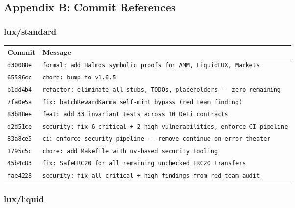 \documentclass[
]{article}
\newcounter{none} %
\begin{document}
\subsection{Appendix B: Commit
References}\label{appendix-b-commit-references}

\subsubsection{lux/standard}\label{luxstandard}

{\def\LTcaptype{none} %
\begin{longtable}[]{@{}ll@{}}
\toprule\noalign{}
Commit & Message \\
\midrule\noalign{}
\endhead
\bottomrule\noalign{}
\endlastfoot
\texttt{d30088e} &
\texttt{formal:\ add\ Halmos\ symbolic\ proofs\ for\ AMM,\ LiquidLUX,\ Markets} \\
\texttt{65586cc} & \texttt{chore:\ bump\ to\ v1.6.5} \\
\texttt{b1dd4b4} &
\texttt{refactor:\ eliminate\ all\ stubs,\ TODOs,\ placeholders\ -\/-\ zero\ remaining} \\
\texttt{7fa0e5a} &
\texttt{fix:\ batchRewardKarma\ self-mint\ bypass\ (red\ team\ finding)} \\
\texttt{83b88ee} &
\texttt{feat:\ add\ 33\ invariant\ tests\ across\ 10\ DeFi\ contracts} \\
\texttt{d2d51ce} &
\texttt{security:\ fix\ 6\ critical\ +\ 2\ high\ vulnerabilities,\ enforce\ CI\ pipeline} \\
\texttt{83a8ce5} &
\texttt{ci:\ enforce\ security\ pipeline\ -\/-\ remove\ continue-on-error\ theater} \\
\texttt{1795c5c} &
\texttt{chore:\ add\ Makefile\ with\ uv-based\ security\ tooling} \\
\texttt{45b4c83} &
\texttt{fix:\ SafeERC20\ for\ all\ remaining\ unchecked\ ERC20\ transfers} \\
\texttt{fae4228} &
\texttt{security:\ fix\ all\ critical\ +\ high\ findings\ from\ red\ team\ audit} \\
\end{longtable}
}

\subsubsection{lux/liquid}\label{luxliquid}
\end{document}
